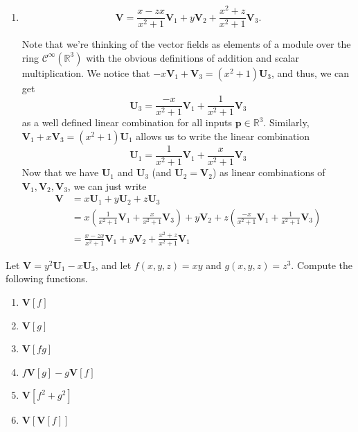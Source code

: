 \documentclass[12 pt, letterpaper]{hmcpset}
\begin{document}
\begin{solution}
\begin{enumerate}
			Thus, $\mathbf V_1(\mathbf p), \mathbf V_2(\mathbf p), \mathbf V_3(\mathbf p)$ is a linearly independent list of vectors in $\mathrm T_{\mathbf p} \mathbb R^3$ for all $\mathbf p \in \mathbb R^3$.
		\item
			\[
				\boxed{
					\mathbf V = \frac{x - zx}{x^2 + 1} \mathbf V_1 + y \mathbf V_2 + \frac{x^2 + z}{x^2 + 1} \mathbf V_3.
				}
			\] 

			Note that we're thinking of the vector fields as elements of a module over the ring $\mathcal C^\infty(\mathbb R^3)$ with the obvious definitions of addition and scalar multiplication. 
			We notice that $-x \mathbf V_1 + \mathbf V_3 = (x^2 + 1) \mathbf U_3$, and thus, we can get
			\[
				\mathbf U_3 = \frac{-x}{x^2 + 1} \mathbf V_1 + \frac{1}{x^2 + 1} \mathbf V_3
			\]
			as a well defined linear combination for all inputs $\mathbf p \in \mathbb R^3$. Similarly, $\mathbf V_1 + x \mathbf V_3 = (x^2 + 1) \mathbf U_1$ allows us to write the linear combination
			\[
				\mathbf U_1 = \frac{1}{x^2 + 1} \mathbf V_1 + \frac{x}{x^2 + 1} \mathbf V_3
			\]
			Now that we have $\mathbf U_1$ and $\mathbf U_3$ (and $\mathbf U_2 = \mathbf V_2$) as linear combinations of $\mathbf V_1, \mathbf V_2, \mathbf V_3$, we can just write
			\[
				\begin{split}
					\mathbf V & = x \mathbf U_1 + y \mathbf U_2 + z \mathbf U_3 \\
						  & = x \left ( \frac{1}{x^2 + 1} \mathbf V_1 + \frac{x}{x^2 + 1} \mathbf V_3 \right ) + y \mathbf V_2 + z \left ( \frac{-x}{x^2 + 1} \mathbf V_1 + \frac{1}{x^2 + 1} \mathbf V_3 \right ) \\
						  & = \frac{x - zx}{x^2 + 1} \mathbf V_1 + y \mathbf V_2 + \frac{x^2 + z}{x^2 + 1} \mathbf V_1
				\end{split}
			\]
	\end{enumerate}
\end{solution}

\pagebreak

\begin{problem}[Problem 2.]
	Let $\mathbf V = y^2 \mathbf U_1 - x \mathbf U_3$, and let $f(x, y, z) = xy$ and $g(x, y, z) = z^3$. Compute the following functions.
	\begin{enumerate}
		\item $\mathbf V[f]$
		\item $\mathbf V[g]$
		\item $\mathbf V[fg]$
		\item $f \mathbf V[g] - g \mathbf V[f]$
		\item $\mathbf V[f^2 + g^2]$
		\item $\mathbf V[\mathbf V[f]]$
	\end{enumerate}
\end{problem}
\end{document}
